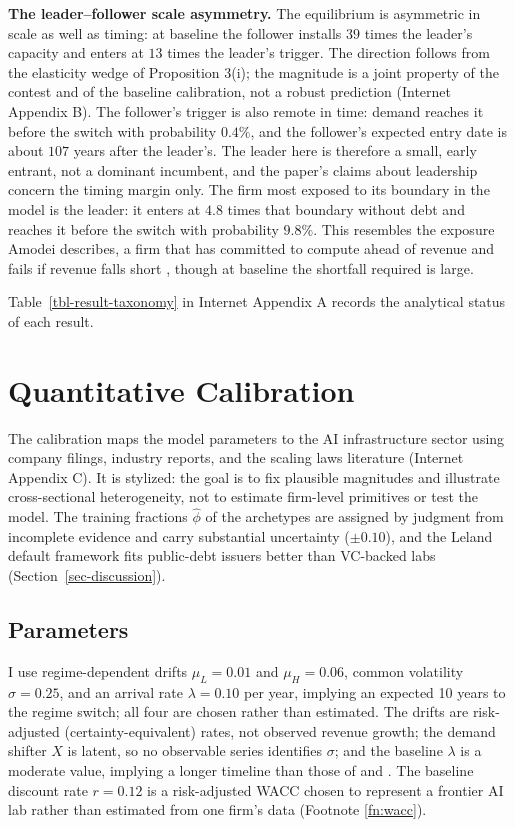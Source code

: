 \documentclass[
  11pt,
  letterpaper,
]{scrartcl}
\begin{document}
\textbf{The leader--follower scale asymmetry.} The equilibrium is
asymmetric in scale as well as timing: at baseline the follower installs
\(39\) times the leader's capacity and enters at \(13\) times the
leader's trigger. The direction follows from the elasticity wedge of
Proposition 3(i); the magnitude is a joint property of the contest and
of the baseline calibration, not a robust prediction (Internet Appendix
B). The follower's trigger is also remote in time: demand reaches it
before the switch with probability \(0.4\%\), and the follower's
expected entry date is about \(107\) years after the leader's. The
leader here is therefore a small, early entrant, not a dominant
incumbent, and the paper's claims about leadership concern the timing
margin only. The firm most exposed to its boundary in the model is the
leader: it enters at \(4.8\) times that boundary without debt and
reaches it before the switch with probability \(9.8\%\). This resembles
the exposure Amodei describes, a firm that has committed to compute
ahead of revenue and fails if revenue falls short
\citep{amodei2026dwarkesh}, though at baseline the shortfall required is
large.

Table~\ref{tbl-result-taxonomy} in Internet Appendix A records the
analytical status of each result.

\section{Quantitative Calibration}\label{sec-calibration}

The calibration maps the model parameters to the AI infrastructure
sector using company filings, industry reports, and the scaling laws
literature (Internet Appendix C). It is stylized: the goal is to fix
plausible magnitudes and illustrate cross-sectional heterogeneity, not
to estimate firm-level primitives or test the model. The training
fractions \(\hat{\phi}\) of the archetypes are assigned by judgment from
incomplete evidence and carry substantial uncertainty (\(\pm 0.10\)),
and the Leland default framework fits public-debt issuers better than
VC-backed labs (Section~\ref{sec-discussion}).

\subsection{Parameters}\label{parameters}

I use regime-dependent drifts \(\mu_L = 0.01\) and \(\mu_H = 0.06\),
common volatility \(\sigma = 0.25\), and an arrival rate
\(\lambda = 0.10\) per year, implying an expected 10 years to the regime
switch; all four are chosen rather than estimated. The drifts are
risk-adjusted (certainty-equivalent) rates, not observed revenue growth;
the demand shifter \(X\) is latent, so no observable series identifies
\(\sigma\); and the baseline \(\lambda\) is a moderate value, implying a
longer timeline than those of \citet{amodei2024machines} and
\citet{amodei2026dwarkesh}. The baseline discount rate \(r = 0.12\) is a
risk-adjusted WACC chosen to represent a frontier AI lab rather than
estimated from one firm's data ({Footnote \ref{fn:wacc}}).
\end{document}

